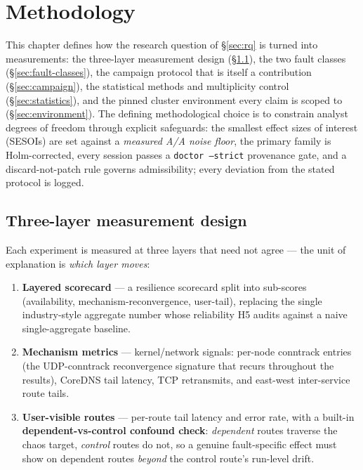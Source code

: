 \chapter{Methodology}\label{ch:methodology}

This chapter defines how the research question of \S\ref{sec:rq} is turned into
measurements: the three-layer measurement design (\S\ref{sec:three-layer}), the
two fault classes (\S\ref{sec:fault-classes}), the
campaign protocol that is itself a contribution (\S\ref{sec:campaign}), the
statistical methods and multiplicity control (\S\ref{sec:statistics}), and the
pinned cluster environment every claim is scoped to (\S\ref{sec:environment}).
The defining methodological choice is to constrain analyst degrees of freedom
through explicit safeguards: the smallest effect sizes of interest (SESOIs) are
set against a \emph{measured A/A noise floor}, the primary family is
Holm-corrected, every session passes a \texttt{doctor --strict} provenance gate,
and a discard-not-patch rule governs admissibility; every deviation from the
stated protocol is logged.

\section{Three-layer measurement design}\label{sec:three-layer}

Each experiment is measured at three layers that need not agree --- the unit of
explanation is \emph{which layer moves}:

\begin{enumerate}
\item \textbf{Layered scorecard} --- a resilience scorecard split into
  sub-scores (availability, mechanism-reconvergence, user-tail), replacing the
  single industry-style aggregate number whose reliability H5 audits against a
  naive single-aggregate baseline.
\item \textbf{Mechanism metrics} --- kernel/network signals: per-node conntrack
  entries (the UDP-conntrack reconvergence signature that recurs throughout the
  results), CoreDNS tail latency, TCP retransmits, and east-west inter-service
  route tails.
\item \textbf{User-visible routes} --- per-route tail latency and error rate,
  with a built-in \textbf{dependent-vs-control confound check}: \emph{dependent}
  routes traverse the chaos target, \emph{control} routes do not, so a genuine
  fault-specific effect must show on dependent routes \emph{beyond} the control
  route's run-level drift.
\end{enumerate}

